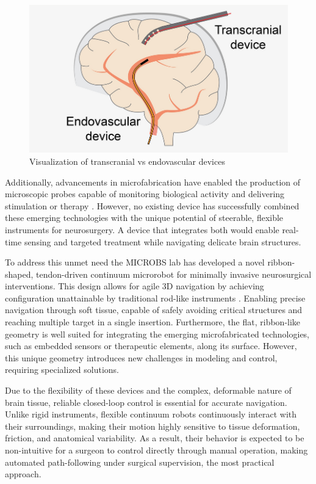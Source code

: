 \begin{figure} [H]
    \centering
    \includegraphics[width=0.8\linewidth]{images/brain surgery/43577_2023_644_Figa_HTML.png}
    \caption{Visualization of transcranial vs endovascular devices}
    \label{fig:transcranialvsendocascular}
\end{figure}

Additionally, advancements in microfabrication have enabled the production of microscopic probes capable of monitoring biological activity and delivering stimulation or therapy \cite{chen_neural_2017} \cite{frank_next-generation_2019}.  However, no existing device has successfully combined these emerging technologies with the unique potential of steerable, flexible instruments for neurosurgery. A device that integrates both would enable real-time sensing and targeted treatment while navigating delicate brain structures.

To address this unmet need the MICROBS lab has developed a novel ribbon-shaped, tendon-driven continuum microrobot for minimally invasive neurosurgical interventions. This design allows for agile 3D navigation by achieving configuration unattainable by traditional rod-like instruments \cite{noseda_flat_2024}. Enabling precise navigation through soft tissue, capable of safely avoiding critical structures and reaching multiple target in a single insertion.  Furthermore, the flat, ribbon-like geometry is well suited for integrating the emerging microfabricated technologies, such as embedded sensors or therapeutic elements, along its surface. However, this unique geometry introduces new challenges in modeling and control, requiring specialized solutions. 

Due to the flexibility of these devices and the complex, deformable nature of brain tissue, reliable closed-loop control is essential for accurate navigation. Unlike rigid instruments, flexible continuum robots continuously interact with their surroundings, making their motion highly sensitive to tissue deformation, friction, and anatomical variability. As a result, their behavior is expected to be non-intuitive for a surgeon to control directly through manual operation, making automated path-following under surgical supervision, the most practical approach.

